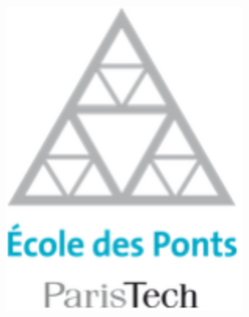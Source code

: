 \documentclass[a0,portrait]{a0poster}
\begin{document}
\begin{tcolorbox}
\begin{minipage}[c]{0.10\linewidth}
\includegraphics[width=8cm]{enpc.png}\\
\end{minipage}
\end{tcolorbox}



\end{document}
